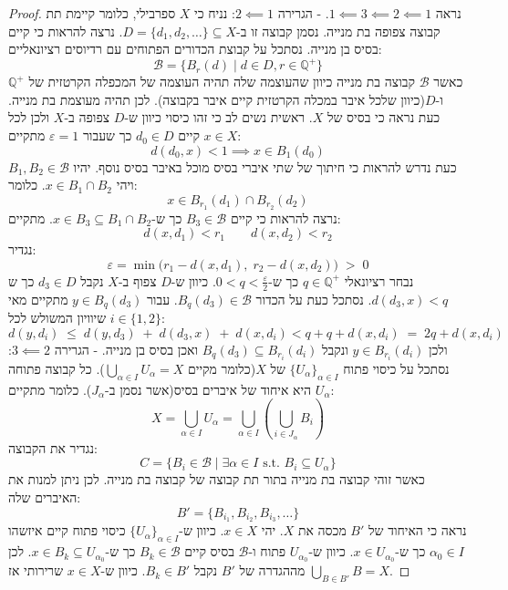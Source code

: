 \documentclass{tstextbook}
\begin{document}
\begin{proof}
נראה \(1 \impliedby 3 \impliedby 2 \impliedby 1\).
- הגרירה \(2\impliedby 1\): נניח כי \(X\) ספרבילי, כלומר קיימת תת קבוצה צפופה בת מנייה. נסמן קבוצה זו ב-\(D=\{ d_{1},d_{2},\dots \}\subseteq X\). נרצה להראות כי קיים בסיס בן מנייה. נסתכל על קבוצת הכדורים הפתוחים עם רדיוסים רציונאליים:
$${\mathcal{B}}=\{B_{r}(d)\mid d\in D,r\in\mathbb{Q}^{+}\}$$
כאשר \(\mathcal{B}\) קבוצה בת מנייה כיוון שהעוצמה שלה תהיה העוצמה של המכפלה הקרטזית של \(\mathbb{Q}^{+}\) ו-\(D\)(כיוון שלכל איבר במכלה הקרטזית קיים איבר בקבוצה). לכן תהיה מעוצמת בת מנייה. כעת נראה כי בסיס של \(X\).
ראשית נשים לב כי זהו כיסוי כיוון ש-\(D\) צפופה ב-\(X\) ולכן לכל \(x \in X\) קיים \(d_{0} \in D\) כך שעבור \(\varepsilon=1\) מתקיים:
$$d(d_{0},x)<1\implies x \in B_{1}(d_{0})$$
כעת נדרש להראות כי חיתוך של שתי איברי בסיס מוכל באיבר בסיס נוסף. יהיו \(B_{1},B_{2}\in \mathcal{B}\) ויהי \(x \in B_{1}\cap B_{2}\). כלומר:
$$x \in  B_{r_{1}}(d_{1}) \cap  B_{r_{2}}(d_{2})$$
נרצה להראות כי קיים \(B_{3}\in \mathcal{ B}\) כך ש-\(x \in B_{3}\subseteq B_{1}\cap B_{2}\). מתקיים:
$$d(x,d_{1})<r_{1}\qquad d(x,d_{2})<r_{2}$$
נגדיר:
$$\varepsilon=\operatorname*{min}\bigl(r_{1}-d(x,d_{1}),\;r_{2}-d(x,d_{2})\bigr)\;>\;0$$
נבחר רציונאלי \(q \in \mathbb{Q}^{+}\) כך ש-\(0<q<\frac{\varepsilon}{2}\). כיוון ש-\(D\) צפוף ב-\(X\) נקבל \(d_{3} \in D\) כך ש \(d(d_{3},x)<q\). נסתכל כעת על הכדור \(B_{q}(d_{3})\in \mathcal{B}\). עבור \(y \in B_{q}(d_{3})\) מתקיים מאי שיוויון המשולש לכל \(i \in \{ 1,2 \}\):
$$d(y,d_{i})\;\leq\;d(y,d_{3})\;+\;d(d_{3},x)\;+\;d(x,d_{i})<q+q+d(x,d_{i})\;=\;2q+d(x,d_{i})$$
ולכן \(y \in B_{r_{i}}(d_{i})\) ונקבל \(B_{q}(d_{3})\subseteq B_{r_{i}}(d_{i})\) ואכן בסיס בן מנייה.
- הגרירה \(3\impliedby 2\):
נסתכל על כיסוי פתוח \(\{ U_{\alpha} \}_{\alpha \in I}\) של \(X\)(כלומר מקיים \(\bigcup_{\alpha \in I}U_{\alpha}=X\)). כל קבוצה פתוחה \(U_{\alpha}\) היא איחוד של איברים בסיס(אשר נסמן ב-\(J_{\alpha}\)). כלומר מתקיים:
$$X=\bigcup_{\alpha\in I}U_{\alpha}=\bigcup_{\alpha\in I}\left(\bigcup_{i\in J_{\alpha}}B_{i}\right)$$
נגדיר את הקבוצה:
$$C=\{ B_{i}\in \mathcal{B} \mid  \exists \alpha \in I\text{  s.t. } B_{i}\subseteq U_{\alpha} \}$$
כאשר זוהי קבוצה בת מנייה בתור תת קבוצה של קבוצה בת מנייה. לכן ניתן למנות את האיברים שלה:
$$B'=\{ B_{i_{1}},B_{i_{2}},B_{i_{3}},\dots \}$$
נראה כי האיחוד של \(B'\) מכסה את \(X\). יהי \(x \in X\). כיוון ש-\(\{ U_{\alpha} \}_{\alpha \in I}\) כיסוי פתוח קיים איזשהו \(\alpha_{0} \in I\) כך ש-\(x \in U_{\alpha_{0}}\). כיוון ש-\(U_{\alpha_{0}}\) פתוח ו-\(\mathcal{B}\) בסיס קיים \(B_{k}\in \mathcal{B}\) כך ש-\(x \in B_{k}\subseteq U_{\alpha_{0}}\). לכן מההגדרה של \(B'\) נקבל \(B_{k}\in B'\). כיוון ש-\(x \in X\) שרירותי אז \(\bigcup_{B \in B'}B=X\).

\end{proof}
\end{document}
